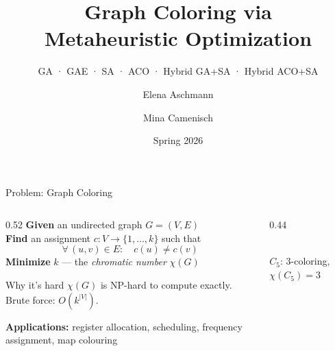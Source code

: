 \documentclass[aspectratio=169,10pt]{beamer}
\title[Graph Coloring via Metaheuristics]%
      {Graph Coloring via\\Metaheuristic Optimization}
\subtitle{GA · GAE · SA · ACO · Hybrid GA+SA · Hybrid ACO+SA}
\author{Elena Aschmann \and Mina Camenisch}
\institute{Optimization Methods for Engineers, 227-0707-00L\\ETH Zürich}
\date{Spring 2026}
\newcommand{\col}{c}
\begin{document}
\begin{frame}
\titlepage
\end{frame}

\begin{frame}{Problem: Graph Coloring}

\begin{columns}[T]
\begin{column}{0.52\textwidth}
\textbf{Given} an undirected graph $G = (V, E)$\\[0.5em]
\textbf{Find} an assignment $\col: V \to \{1,\ldots,k\}$ such that
\[
  \forall\,(u,v)\in E: \quad \col(u) \neq \col(v)
\]
\textbf{Minimize} $k$ — the \emph{chromatic number} $\chi(G)$\\[1em]

\begin{block}{Why it's hard}
$\chi(G)$ is NP-hard to compute exactly. Brute force: $O(k^{|V|})$.
\end{block}

\vspace{0.5em}
\textbf{Applications:} register allocation, scheduling, frequency assignment, map colouring
\end{column}

\begin{column}{0.44\textwidth}
\centering
{}\\[0.3em]
{\small $C_5$: 3-coloring, $\chi(C_5)=3$}
\end{column}
\end{columns}

\end{frame}
\end{document}
